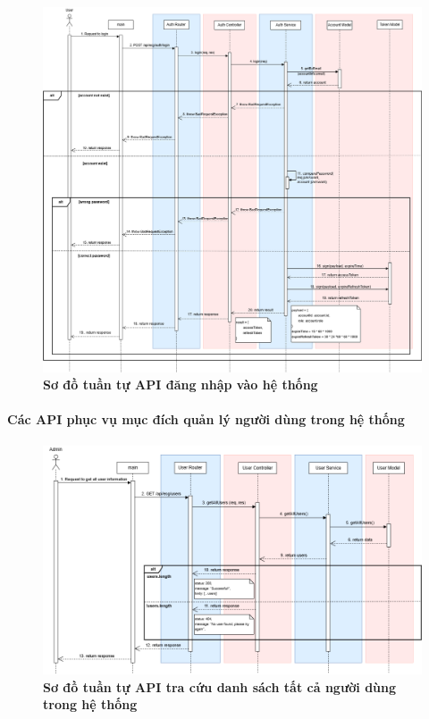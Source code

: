 \begin{figure}[H]
	\centering
	\includegraphics[width=16cm]{Images/api_sequence/authen/authentication-login.drawio.png}
	\caption[Sơ đồ tuần tự API đăng nhập vào hệ thống]{\bfseries \fontsize{12pt}{0pt}\selectfont Sơ đồ tuần tự API đăng nhập vào hệ thống}
	\label{sequence_diagram_login}
\end{figure}

\clearpage
\paragraph{Các API phục vụ mục đích quản lý người dùng trong hệ thống}
\mbox{}
\begin{figure}[H]
	\centering
	\includegraphics[width=16cm]{Images/api_sequence/user/getAllUsers.drawio.png}
	\caption[Sơ đồ tuần tự API tra cứu danh sách tất cả người dùng trong hệ thống]{\bfseries \fontsize{12pt}{0pt}\selectfont Sơ đồ tuần tự API tra cứu danh sách tất cả người dùng trong hệ thống}
	\label{sequence_diagram_get_all_users}
\end{figure}

